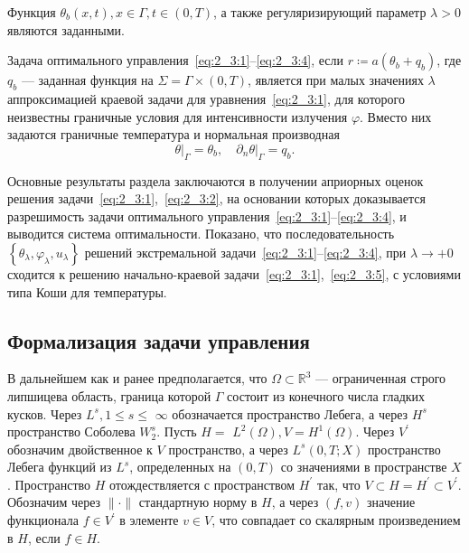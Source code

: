Функция $\theta_{b}(x, t), x \in \Gamma, t \in(0, T)$,
а также регуляризирующий параметр $\lambda>0$ являются заданными.

Задача оптимального управления~\eqref{eq:2_3:1}--\eqref{eq:2_3:4},
если $r \coloneqq a\left(\theta_{b}+q_{b}\right)$,
где $q_{b}$ — заданная функция на $\Sigma =\Gamma \times(0, T)$,
является при малых значениях $\lambda$ аппроксимацией краевой
задачи для уравнения~\eqref{eq:2_3:1},
для которого неизвестны граничные условия для интенсивности излучения $\varphi$.
Вместо них задаются граничные температура и нормальная производная
\begin{equation}
    \label{eq:2_3:5}
    \left.\theta\right|_{\Gamma}=\theta_{b},
    \left.\quad \partial_{n} \theta\right|_{\Gamma}=q_{b}.
\end{equation}

Основные результаты раздела заключаются в получении априорных
оценок решения задачи~\eqref{eq:2_3:1},~\eqref{eq:2_3:2},
на основании которых доказывается разрешимость задачи
оптимального управления~\eqref{eq:2_3:1}--\eqref{eq:2_3:4},
и выводится система оптимальности.
Показано, что последовательность
$\left\{\theta_{\lambda}, \varphi_{\lambda}, u_{\lambda}\right\}$
решений экстремальной задачи~\eqref{eq:2_3:1}--\eqref{eq:2_3:4},
при $ \lambda \rightarrow+0$
сходится к решению начально-краевой задачи~\eqref{eq:2_3:1},~\eqref{eq:2_3:5},
с условиями типа Коши для температуры.

\subsection{Формализация задачи управления}\label{subsec:ch2/sec3/formalization}
В дальнейшем как и ранее предполагается,
что $\Omega \subset \mathbb{R}^{3}$ — ограниченная строго липшицева область,
граница которой $\Gamma$ состоит из конечного числа гладких кусков.
Через $L^{s}, 1 \leq s \leq$ $\infty$
обозначается пространство Лебега, а через $H^{s}$
пространство Соболева $W_{2}^{s}$.
Пусть $H=$ $L^{2}(\Omega), V=H^{1}(\Omega)$.
Через $V^{\prime}$ обозначим двойственное к $V$ пространство,
а через $L^{s}(0, T; X)$
пространство Лебега функций из $L^{s}$, определенных
на $(0, T)$ со значениями в пространстве $X$.
Пространство $H$ отождествляется с пространством
$H^{\prime}$ так, что $V \subset H=H^{\prime} \subset V^{\prime}$.
Обозначим через $\|\cdot\|$ стандартную норму в $H$, а через $(f, v)$
значение функционала $f \in V^{\prime}$ в элементе $v \in V$,
что совпадает со скалярным произведением в $H$, если $f \in H$.

